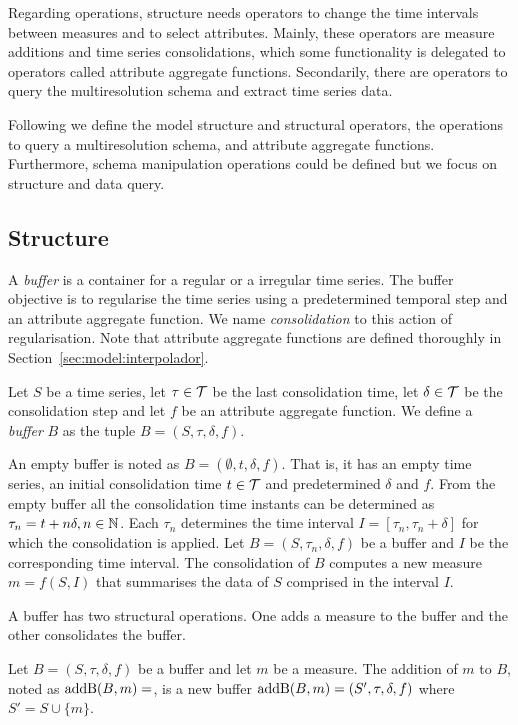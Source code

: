 Regarding operations,  structure needs operators to change
the time intervals between measures and to select attributes. Mainly,
these operators are measure additions and time series consolidations,
which some functionality is delegated to operators called attribute
aggregate functions. Secondarily, there are operators to query the
multiresolution schema and extract time series data.


Following we define the  model structure and structural
operators, the operations to query a multiresolution schema, and
attribute aggregate functions.  Furthermore, schema manipulation
operations could be defined but we focus on structure and data query.


\subsection{Structure}

A \emph{buffer} is a container for a regular or a irregular time
series. The buffer objective is to regularise the time series using a
predetermined temporal step and an attribute aggregate function.  We
name \emph{consolidation} to this action of regularisation.  Note that
attribute aggregate functions are defined thoroughly in
Section~\ref{sec:model:interpolador}.
\begin{definition}%
  Let $S$ be a time series, let $\tau\in\cal{T}$ be the last
  consolidation time, let $\delta\in\cal{T}$ be the consolidation step
  and let $f$ be an attribute aggregate function. We define a
  \emph{buffer} $B$ as the tuple $B=(S,\tau,\delta,f)$.
\end{definition}

An empty buffer is noted as $B = (\emptyset,t, \delta, f)$. That is,
it has an empty time series, an initial consolidation time
$t\in\cal{T}$ and predetermined $\delta$ and $f$.  From the empty
buffer all the consolidation time instants can be determined as
$\tau_n=t+n\delta, n\in\mathbb{N}$.  Each $\tau_n$ determines the time
interval $I=[\tau_n,\tau_n+\delta]$ for which the consolidation is
applied. Let $B=(S,\tau_n,\delta,f)$ be a buffer and $I$ be the
corresponding time interval. The consolidation of $B$ computes a new
measure $m=f(S,I)$ that summarises the data of $S$ comprised in the
interval $I$.

A buffer has two structural operations. One adds a measure to the
buffer and the other consolidates the buffer.

Let $B=(S,\tau,\delta,f)$ be a buffer and let $m$ be a measure.  The
addition of $m$ to $B$, noted as $\operatorname{addB}(B,m)=$, is a new buffer
$\operatorname{addB}(B,m)=(S',\tau,\delta,f)$ where $S' = S \cup \{m\} $.

